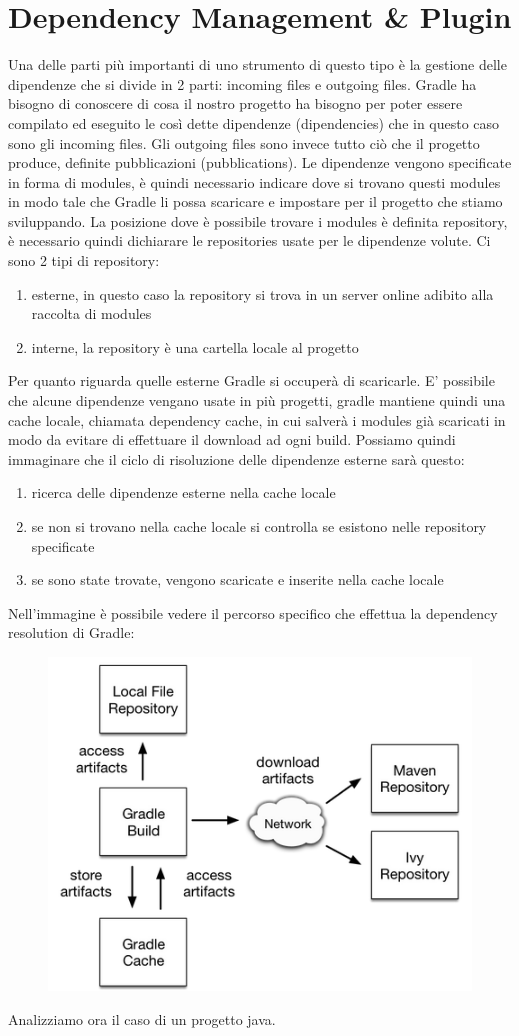 \section{Dependency Management \& Plugin}
Una delle parti più importanti di uno strumento di questo tipo è la gestione delle dipendenze che si divide in 2 parti: incoming files e outgoing files. Gradle ha bisogno di conoscere di cosa il nostro progetto ha bisogno per poter essere compilato ed eseguito le così dette dipendenze (dipendencies) che in questo caso sono gli incoming files. Gli outgoing files sono invece tutto ciò che il progetto produce, definite pubblicazioni (pubblications). Le dipendenze vengono specificate in forma di modules, è quindi necessario indicare dove si trovano questi modules in modo tale che Gradle li possa scaricare e impostare per il progetto che stiamo sviluppando. La posizione dove è possibile trovare i modules è definita repository, è necessario quindi dichiarare le repositories usate per le dipendenze volute. Ci sono 2 tipi di repository: 
\begin{enumerate}
    \item esterne, in questo caso la repository si trova in un server online adibito alla raccolta di modules
    \item interne, la repository è una cartella locale al progetto
\end{enumerate}
Per quanto riguarda quelle esterne Gradle si occuperà di scaricarle. E' possibile che alcune dipendenze vengano usate in più progetti, gradle mantiene quindi una cache locale, chiamata dependency cache, in cui salverà i modules già scaricati in modo da evitare di effettuare il download ad ogni build. Possiamo quindi immaginare che il ciclo di risoluzione delle dipendenze esterne sarà questo:
\begin{enumerate}
    \item ricerca delle dipendenze esterne nella cache locale
    \item se non si trovano nella cache locale si controlla se esistono nelle repository specificate
    \item se sono state trovate, vengono scaricate e inserite nella cache locale
\end{enumerate}
Nell'immagine è possibile vedere il percorso specifico che effettua la dependency resolution di Gradle:
\begin{figure}[H]
\centering
\includegraphics[width=0.4\linewidth]{3DependencyManagement/depMan.png}
\end{figure}
Analizziamo ora il caso di un progetto java.






